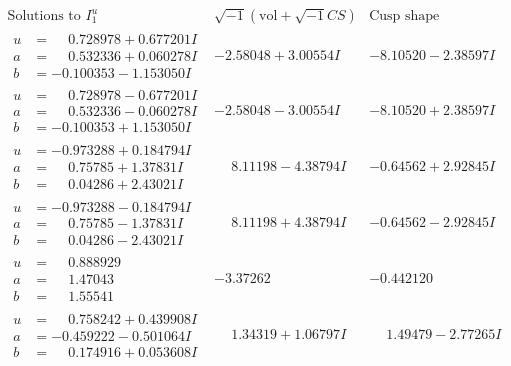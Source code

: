 \documentclass[1p]{elsarticle_modified}
\theoremstyle{definition}
\newcommand{\I}{\sqrt{-1}}
\begin{document}
$$\begin{array}{c|c|c}  
\text{Solutions to }I^u_{1}& \I (\text{vol} + \sqrt{-1}CS) & \text{Cusp shape}\\
 \hline 
\begin{aligned}
u &= \phantom{-}0.728978 + 0.677201 I \\
a &= \phantom{-}0.532336 + 0.060278 I \\
b &= -0.100353 - 1.153050 I\end{aligned}
 & -2.58048 + 3.00554 I & -8.10520 - 2.38597 I \\ \hline\begin{aligned}
u &= \phantom{-}0.728978 - 0.677201 I \\
a &= \phantom{-}0.532336 - 0.060278 I \\
b &= -0.100353 + 1.153050 I\end{aligned}
 & -2.58048 - 3.00554 I & -8.10520 + 2.38597 I \\ \hline\begin{aligned}
u &= -0.973288 + 0.184794 I \\
a &= \phantom{-}0.75785 + 1.37831 I \\
b &= \phantom{-}0.04286 + 2.43021 I\end{aligned}
 & \phantom{-}8.11198 - 4.38794 I & -0.64562 + 2.92845 I \\ \hline\begin{aligned}
u &= -0.973288 - 0.184794 I \\
a &= \phantom{-}0.75785 - 1.37831 I \\
b &= \phantom{-}0.04286 - 2.43021 I\end{aligned}
 & \phantom{-}8.11198 + 4.38794 I & -0.64562 - 2.92845 I \\ \hline\begin{aligned}
u &= \phantom{-}0.888929\phantom{ +0.000000I} \\
a &= \phantom{-}1.47043\phantom{ +0.000000I} \\
b &= \phantom{-}1.55541\phantom{ +0.000000I}\end{aligned}
 & -3.37262\phantom{ +0.000000I} & -0.442120\phantom{ +0.000000I} \\ \hline\begin{aligned}
u &= \phantom{-}0.758242 + 0.439908 I \\
a &= -0.459222 - 0.501064 I \\
b &= \phantom{-}0.174916 + 0.053608 I\end{aligned}
 & \phantom{-}1.34319 + 1.06797 I & \phantom{-}1.49479 - 2.77265 I \\ \hline\begin{aligned}

\end{aligned}
\end{array}$$
\end{document}
